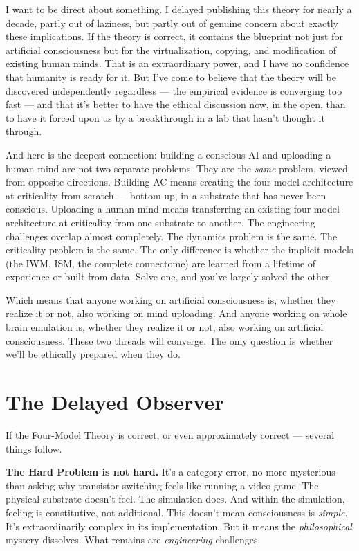 \documentclass[11pt, twoside, openright]{book}
\begin{document}
I want to be direct about something. I delayed publishing this theory for nearly a decade, partly out of laziness, but partly out of genuine concern about exactly these implications. If the theory is correct, it contains the blueprint not just for artificial consciousness but for the virtualization, copying, and modification of existing human minds. That is an extraordinary power, and I have no confidence that humanity is ready for it. But I've come to believe that the theory will be discovered independently regardless --- the empirical evidence is converging too fast --- and that it's better to have the ethical discussion now, in the open, than to have it forced upon us by a breakthrough in a lab that hasn't thought it through.

And here is the deepest connection: building a conscious AI and uploading a human mind are not two separate problems. They are the \textit{same} problem, viewed from opposite directions. Building AC means creating the four-model architecture at criticality from scratch --- bottom-up, in a substrate that has never been conscious. Uploading a human mind means transferring an existing four-model architecture at criticality from one substrate to another. The engineering challenges overlap almost completely. The dynamics problem is the same. The criticality problem is the same. The only difference is whether the implicit models (the IWM, ISM, the complete connectome) are learned from a lifetime of experience or built from data. Solve one, and you've largely solved the other.

Which means that anyone working on artificial consciousness is, whether they realize it or not, also working on mind uploading. And anyone working on whole brain emulation is, whether they realize it or not, also working on artificial consciousness. These two threads will converge. The only question is whether we'll be ethically prepared when they do.


\chapter{The Delayed Observer}

If the Four-Model Theory is correct, or even approximately correct --- several things follow.

\textbf{The Hard Problem is not hard.} It's a category error, no more mysterious than asking why transistor switching feels like running a video game. The physical substrate doesn't feel. The simulation does. And within the simulation, feeling is constitutive, not additional. This doesn't mean consciousness is \textit{simple}. It's extraordinarily complex in its implementation. But it means the \textit{philosophical} mystery dissolves. What remains are \textit{engineering} challenges.
\end{document}
